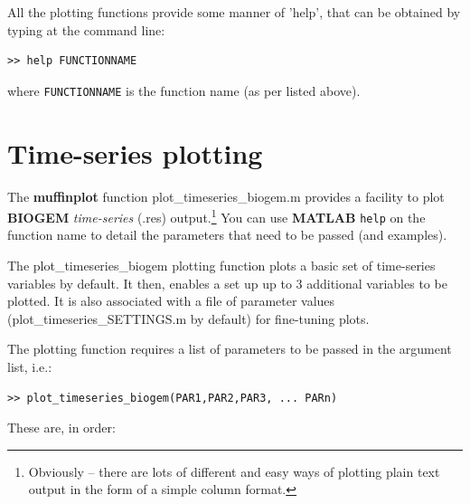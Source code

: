 \documentclass[11pt,fleqn]{book} %
\begin{document}
All the plotting functions provide some manner of 'help', that can be obtained by typing at the command line:
\vspace{-2pt}\begin{verbatim}
>> help FUNCTIONNAME
\end{verbatim}\vspace{-2pt}
where \texttt{FUNCTIONNAME} is the function name (as per listed above).


\section{Time-series plotting}

The \textbf{muffinplot} function \textsf{\footnotesize plot\_timeseries\_biogem.m} provides a facility to plot \textbf{BIOGEM} \textit{time-series} (\textsf{\small .res}) output.\footnote{Obviously -- there are lots of different and easy ways of plotting plain text output in the form of a simple column format.} You can use \textbf{MATLAB} \texttt{help} on the function name to detail the parameters that need to be passed (and examples).

The \textsf{\footnotesize plot\_timeseries\_biogem} plotting function plots a basic set of time-series variables by default. It then, enables a set up up to 3 additional variables to be plotted. It is also associated with a file of parameter values (\textsf{\footnotesize plot\_timeseries\_SETTINGS.m} by default) for fine-tuning plots.

The plotting function requires a list of parameters to be passed in the argument list, i.e.:
\begin{verbatim}
>> plot_timeseries_biogem(PAR1,PAR2,PAR3, ... PARn)
\end{verbatim}

These are, in order:
\end{document}

